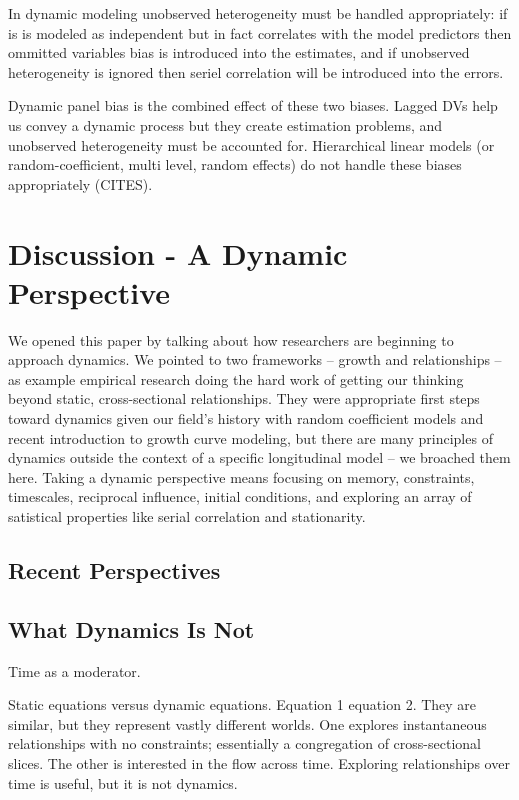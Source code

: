 \documentclass[english,,man]{apa6}
\theoremstyle{definition}
\theoremstyle{definition}
\theoremstyle{definition}
\theoremstyle{remark}
\begin{document}
In dynamic modeling unobserved heterogeneity must be handled
appropriately: if is is modeled as independent but in fact correlates
with the model predictors then ommitted variables bias is introduced
into the estimates, and if unobserved heterogeneity is ignored then
seriel correlation will be introduced into the errors.

Dynamic panel bias is the combined effect of these two biases. Lagged
DVs help us convey a dynamic process but they create estimation
problems, and unobserved heterogeneity must be accounted for.
Hierarchical linear models (or random-coefficient, multi level, random
effects) do not handle these biases appropriately (CITES).

\hypertarget{discussion---a-dynamic-perspective}{%
\section{Discussion - A Dynamic
Perspective}\label{discussion---a-dynamic-perspective}}

We opened this paper by talking about how researchers are beginning to
approach dynamics. We pointed to two frameworks -- growth and
relationships -- as example empirical research doing the hard work of
getting our thinking beyond static, cross-sectional relationships. They
were appropriate first steps toward dynamics given our field's history
with random coefficient models and recent introduction to growth curve
modeling, but there are many principles of dynamics outside the context
of a specific longitudinal model -- we broached them here. Taking a
dynamic perspective means focusing on memory, constraints, timescales,
reciprocal influence, initial conditions, and exploring an array of
satistical properties like serial correlation and stationarity.

\hypertarget{recent-perspectives}{%
\subsection{Recent Perspectives}\label{recent-perspectives}}

\hypertarget{what-dynamics-is-not}{%
\subsection{What Dynamics Is Not}\label{what-dynamics-is-not}}

Time as a moderator.

Static equations versus dynamic equations. Equation 1 equation 2. They
are similar, but they represent vastly different worlds. One explores
instantaneous relationships with no constraints; essentially a
congregation of cross-sectional slices. The other is interested in the
flow across time. Exploring relationships over time is useful, but it is
not dynamics.
\end{document}
